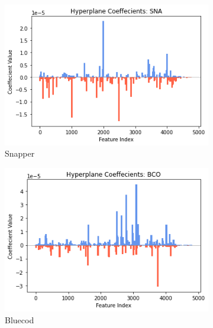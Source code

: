 \documentclass[runningheads]{llncs}
\begin{document}
\begin{figure}[htb]
  \centering
  \caption[SVM Coef]{
      SVM Hyperplane Coeffecients
    }
  \begin{subfigure}[b]{.49\linewidth}
    \includegraphics[width=\linewidth]{fish_hyperplane_sna.png}
    \caption{Snapper}\label{fig:hyperplane-sna}
  \end{subfigure}
  \begin{subfigure}[b]{.49\linewidth}
    \includegraphics[width=\linewidth]{fish_hyperplane_bco.png}
    \caption{Bluecod}\label{fig:hyperplane-bco}
  \end{subfigure}
  \begin{subfigure}[b]{.49\linewidth}

\end{subfigure}
\end{figure}
\end{document}
